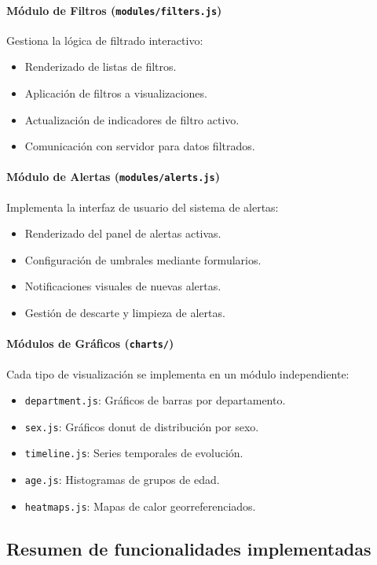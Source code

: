 \documentclass[12pt,a4paper]{article}
\begin{document}
\paragraph{Módulo de Filtros (\texttt{modules/filters.js})}
Gestiona la lógica de filtrado interactivo:
\begin{itemize}
    \item Renderizado de listas de filtros.
    \item Aplicación de filtros a visualizaciones.
    \item Actualización de indicadores de filtro activo.
    \item Comunicación con servidor para datos filtrados.
\end{itemize}

\paragraph{Módulo de Alertas (\texttt{modules/alerts.js})}
Implementa la interfaz de usuario del sistema de alertas:
\begin{itemize}
    \item Renderizado del panel de alertas activas.
    \item Configuración de umbrales mediante formularios.
    \item Notificaciones visuales de nuevas alertas.
    \item Gestión de descarte y limpieza de alertas.
\end{itemize}

\paragraph{Módulos de Gráficos (\texttt{charts/})}
Cada tipo de visualización se implementa en un módulo independiente:
\begin{itemize}
    \item \texttt{department.js}: Gráficos de barras por departamento.
    \item \texttt{sex.js}: Gráficos donut de distribución por sexo.
    \item \texttt{timeline.js}: Series temporales de evolución.
    \item \texttt{age.js}: Histogramas de grupos de edad.
    \item \texttt{heatmaps.js}: Mapas de calor georreferenciados.
\end{itemize}

\subsection{Resumen de funcionalidades implementadas}\label{resumen-funcionalidades}
\end{document}
